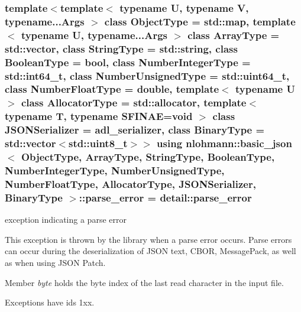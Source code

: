 \subsubsection[{\texorpdfstring{parse\+\_\+error}{parse_error}}]{\setlength{\rightskip}{0pt plus 5cm}template$<$template$<$ typename U, typename V, typename...\+Args $>$ class Object\+Type = std\+::map, template$<$ typename U, typename...\+Args $>$ class Array\+Type = std\+::vector, class String\+Type  = std\+::string, class Boolean\+Type  = bool, class Number\+Integer\+Type  = std\+::int64\+\_\+t, class Number\+Unsigned\+Type  = std\+::uint64\+\_\+t, class Number\+Float\+Type  = double, template$<$ typename U $>$ class Allocator\+Type = std\+::allocator, template$<$ typename T, typename S\+F\+I\+N\+A\+E=void $>$ class J\+S\+O\+N\+Serializer = adl\+\_\+serializer, class Binary\+Type  = std\+::vector$<$std\+::uint8\+\_\+t$>$$>$ using {\bf nlohmann\+::basic\+\_\+json}$<$ Object\+Type, Array\+Type, String\+Type, Boolean\+Type, Number\+Integer\+Type, Number\+Unsigned\+Type, Number\+Float\+Type, Allocator\+Type, J\+S\+O\+N\+Serializer, Binary\+Type $>$\+::{\bf parse\+\_\+error} =  {\bf detail\+::parse\+\_\+error}}\hypertarget{classnlohmann_1_1basic__json_a555b05e9da63d486126759922685a37a}{}\label{classnlohmann_1_1basic__json_a555b05e9da63d486126759922685a37a}


exception indicating a parse error 

This exception is thrown by the library when a parse error occurs. Parse errors can occur during the deserialization of J\+S\+ON text, C\+B\+OR, Message\+Pack, as well as when using J\+S\+ON Patch.

Member {\itshape byte} holds the byte index of the last read character in the input file.

Exceptions have ids 1xx.

